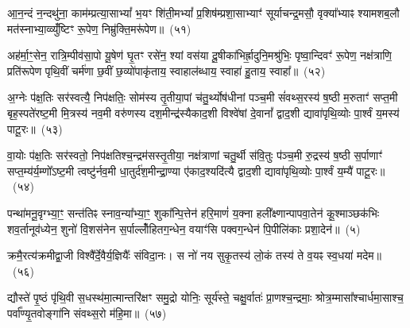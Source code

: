 {\anuvakamend[{ओजो॑ विꣳश॒तिः}]}%

आ॒न॒न्दं न॒न्दथु॑ना॒ काम॑म्प्रत्या॒सा\-भ्यां᳚ भ॒यꣳ शि॑ती॒म\-भ्यां᳚ प्र॒शिष॑म्प्रशा॒साभ्याꣳ॑ सूर्याचन्द्र॒मसौ॒ वृक्या᳚भ्याꣴ श्यामशब॒लौ मत॑स्नाभ्या॒व्व्युँ॑ष्टिꣳ रू॒पेण॒ निम्रु॑क्ति॒मरू॑पेण॥~(५१)

{\anuvakamend[{आ॒न॒न्दꣳ षोड॑श}]}%

अह॑र्मा॒ꣳ॒सेन॒ रात्रि॒म्पीव॑सा॒पो यू॒षेण॑ घृ॒तꣳ रसे॑न॒ श्यां वस॑या दू॒षीका॑भिर्\mbox{}ह्रा॒दुनि॒मश्रु॑भिः॒ पृष्वा॒न्दिवꣳ॑ रू॒पेण॒ नक्ष॑त्राणि॒ प्रति॑रूपेण पृथि॒वीं चर्म॑णा छ॒वीं छ॒व्यो॑पाकृ॑ताय॒ स्वाहाल॑ब्धाय॒ स्वाहा॑ हु॒ताय॒ स्वाहा᳚॥~(५२)

{\anuvakamend[{अह॑र॒ष्टाविꣳ॑शतिः}]}%

अ॒ग्नेः प॑क्ष॒तिः सर॑स्वत्यै॒ निप॑क्षतिः॒ सोम॑स्य तृ॒तीया॒पां च॑तु॒र्थ्योष॑धीनां पञ्च॒मी सं॑वथ्स॒रस्य॑ ष॒ष्ठी म॒रुताꣳ॑ सप्त॒मी बृह॒स्पते॑रष्ट॒मी मि॒त्रस्य॑ नव॒मी वरु॑णस्य दश॒मीन्द्र॑स्यैकाद॒शी विश्वे॑षां दे॒वानां᳚ द्वाद॒शी द्यावा॑पृथि॒व्योः पा॒र्श्वं य॒मस्य॑ पाटू॒रः॥~(५३)

{\anuvakamend[{अ॒ग्नेरेका॒न्नत्रि॒ꣳ॒शत्}]}%

वा॒योः प॑क्ष॒तिः सर॑स्वतो॒ निप॑क्षतिश्च॒न्द्रम॑सस्तृ॒तीया॒ नक्ष॑त्राणां चतु॒र्थी स॑वि॒तुः प॑ञ्च॒मी रु॒द्रस्य॑ ष॒ष्ठी स॒र्पाणाꣳ॑ सप्त॒म्य॑र्य॒म्णो᳚\-ऽष्ट॒मी त्वष्टु॑र्नव॒मी धा॒तुर्द॑श॒मीन्द्रा॒ण्या ए॑काद॒श्यदि॑त्यै द्वाद॒शी द्यावा॑पृथि॒व्योः पा॒र्श्वं य॒म्यै॑ पाटू॒रः॥~(५४)

{\anuvakamend[{वा॒योर॒ष्टाविꣳ॑शतिः}]}%

पन्था॑मनू॒वृग्भ्या॒ꣳ॒ सन्त॑तिꣴ स्नाव॒न्या᳚भ्या॒ꣳ॒ शुका᳚न्पि॒त्तेन॑ हरि॒माणं॑ य॒क्ना हली᳚क्ष्णान्पापवा॒तेन॑ कू॒श्माञ्छक॑भिः शव॒र्तानूव॑ध्येन॒ शुनो॑ वि॒शस॑नेन स॒र्पाल्लोँ॑हितग॒न्धेन॒ वयाꣳ॑सि पक्वग॒न्धेन॑ पि॒पीलि॑काः प्रशा॒देन॑॥~(५)

{\anuvakamend[{पन्था॒न्द्वाविꣳ॑शतिः}]}%

क्रमै॒रत्य॑क्रमीद्वा॒जी विश्वै᳚र्दे॒वैर्य॒ज्ञियैः᳚ संविदा॒नः। स नो॑ नय सुकृ॒तस्य॑ लो॒कं तस्य॑ ते व॒यꣴ स्व॒धया॑ मदेम॥~(५६)

{\anuvakamend[{क्रमै॑र॒ष्टाद॑श}]}%

द्यौस्ते॑ पृ॒ष्ठं पृ॑थि॒वी स॒धस्थ॑मा॒त्मान्तरि॑क्षꣳ समु॒द्रो योनिः॒ सूर्य॑स्ते॒ चक्षु॒र्वातः॑ प्रा॒णश्च॒न्द्रमाः॒ श्रोत्र॒म्मासा᳚श्चार्धमा॒साश्च॒ पर्वा᳚ण्यृ॒तवोङ्गा॑नि संवथ्स॒रो म॑हि॒मा॥~(५७)

{\anuvakamend[{द्यौः पञ्च॑विꣳशतिः}]}%

